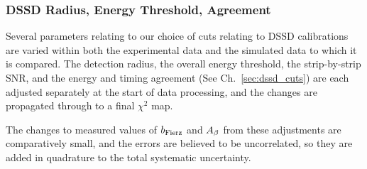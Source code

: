 
\subsubsection{DSSD Radius, Energy Threshold, Agreement}
\label{section:bb1_systematics}
Several parameters relating to our choice of cuts relating to DSSD calibrations are varied within both the experimental data and the simulated data to which it is compared.  The detection radius, the overall energy threshold, the strip-by-strip SNR, and the energy and timing agreement (See Ch.~\ref{sec:dssd_cuts}) are each adjusted separately at the start of data processing, and the changes are propagated through to a final $\chi^2$ map.  

The changes to measured values of $b_{\mathrm{Fierz}}$ and $A_{\beta}$ from these adjustments are comparatively small, and the errors are believed to be uncorrelated, so they are added in quadrature to the total systematic uncertainty.


	
